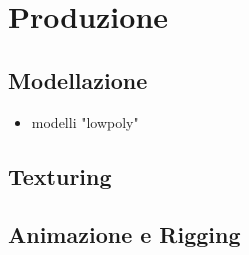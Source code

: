 
\chapter{Produzione} %

\label{Chapter5} %


\section{Modellazione}
\begin{itemize}
    \item modelli "lowpoly"
\end{itemize}
\section{Texturing}
\section{Animazione e Rigging}


